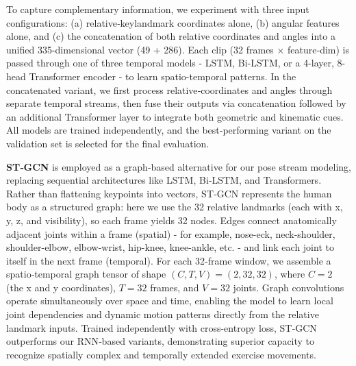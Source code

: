 \documentclass[journal,onecolumn, 11pt]{IEEEtran}
\begin{document}
To capture complementary information, we experiment with three input configurations: (a) relative‐keylandmark coordinates alone, (b) angular features alone, and (c) the concatenation of both relative coordinates and angles into a unified 335-dimensional vector (49 + 286). Each clip (32 frames × feature‐dim) is passed through one of three temporal models - LSTM, Bi-LSTM, or a 4-layer, 8-head Transformer encoder - to learn spatio-temporal patterns. In the concatenated variant, we first process relative‐coordinates and angles through separate temporal streams, then fuse their outputs via concatenation followed by an additional Transformer layer to integrate both geometric and kinematic cues. All models are trained independently, and the best‐performing variant on the validation set is selected for the final evaluation.


\textbf{ST‐GCN} is employed as a graph‐based alternative for our pose stream modeling, replacing sequential architectures like LSTM, Bi‐LSTM, and Transformers. Rather than flattening keypoints into vectors, ST‐GCN represents the human body as a structured graph: here we use the 32 relative landmarks (each with x, y, z, and visibility), so each frame yields 32 nodes. Edges connect anatomically adjacent joints within a frame (spatial) - for example, nose-eck, neck-shoulder, shoulder-elbow, elbow-wrist, hip-knee, knee-ankle, etc. - and link each joint to itself in the next frame (temporal). For each 32‐frame window, we assemble a spatio‐temporal graph tensor of shape $(C, T, V) = (2, 32, 32)$, where $C=2$ (the x and y coordinates), $T=32$ frames, and $V=32$ joints. Graph convolutions operate simultaneously over space and time, enabling the model to learn local joint dependencies and dynamic motion patterns directly from the relative landmark inputs. Trained independently with cross-entropy loss, ST‐GCN outperforms our RNN‐based variants, demonstrating superior capacity to recognize spatially complex and temporally extended exercise movements. \cite{yan2018stgcn}
\end{document}
